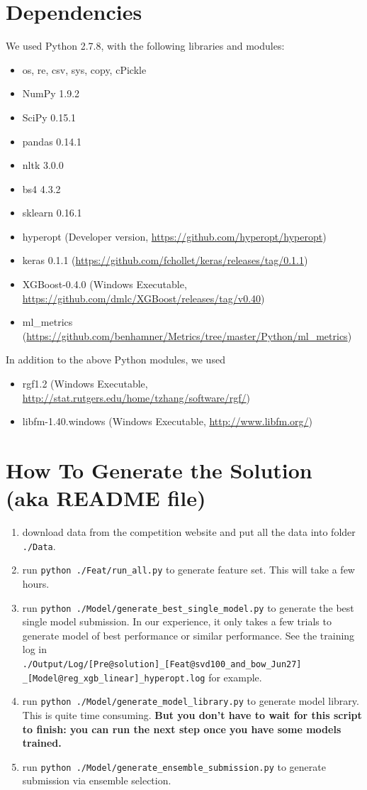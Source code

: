 \documentclass[12pt]{article}
\begin{document}
\section{Dependencies}
We used Python 2.7.8, with the following libraries and modules:
\begin{itemize}
\item os, re, csv, sys, copy, cPickle
\item NumPy 1.9.2
\item SciPy 0.15.1
\item pandas 0.14.1
\item nltk 3.0.0
\item bs4 4.3.2
\item sklearn 0.16.1
\item hyperopt (Developer version, \url{https://github.com/hyperopt/hyperopt})
\item keras 0.1.1 (\url{https://github.com/fchollet/keras/releases/tag/0.1.1})
\item XGBoost-0.4.0 (Windows Executable, \url{https://github.com/dmlc/XGBoost/releases/tag/v0.40})
\item ml\_metrics (\url{https://github.com/benhamner/Metrics/tree/master/Python/ml_metrics})
\end{itemize}
In addition to the above Python modules, we used
\begin{itemize}
\item rgf1.2 (Windows Executable, \url{http://stat.rutgers.edu/home/tzhang/software/rgf/})
\item libfm-1.40.windows (Windows Executable, \url{http://www.libfm.org/})
\end{itemize}

\section{How To Generate the Solution (aka README file)}
\begin{enumerate}
\item download data from the competition website and put all the data into folder \texttt{./Data}.
\item run \texttt{python ./Feat/run\_all.py} to generate feature set. This will take a few hours.
\item run \texttt{python ./Model/generate\_best\_single\_model.py} to generate the best single model submission. In our experience, it only takes a few trials to generate model of best performance or similar performance. See the training log in \\ \texttt{./Output/Log/[Pre@solution]\_[Feat@svd100\_and\_bow\_Jun27]\\
    \_[Model@reg\_xgb\_linear]\_hyperopt.log} for example.
\item run \texttt{python ./Model/generate\_model\_library.py} to generate model library. This is quite time consuming. \textbf{But you don't have to wait for this script to finish: you can run the next step once you have some models trained.}
\item run \texttt{python ./Model/generate\_ensemble\_submission.py} to generate submission via ensemble selection.
\end{enumerate}
\end{document}
